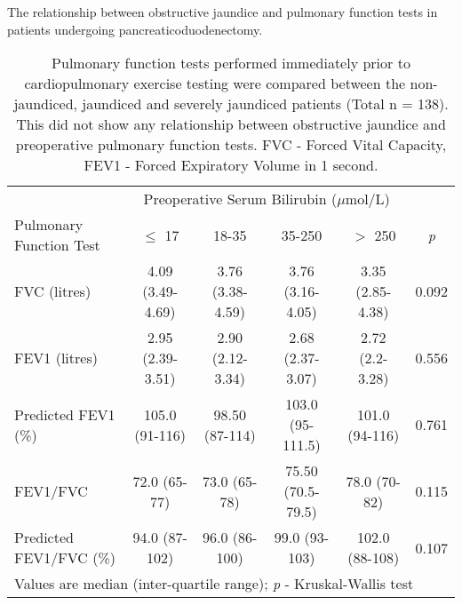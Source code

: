 \begin{sidewaystable}[p]
	\caption{The relationship  between obstructive jaundice and pulmonary function tests in patients undergoing pancreaticoduodenectomy.}
	\label{table:cpet_oj_pft}
	\centering
	\renewcommand{\arraystretch}{1.4} %
	\setlength{\tabcolsep}{9pt} %
	
	\begin{tabular}{|l| c c c c c|}
		\hline
		                        &       \multicolumn{4}{c}{Preoperative Serum Bilirubin ($\mu$mol/L)}        &  \\
		Pulmonary Function Test & $\leq$ 17        & 18-35            & 35-250            & $>$ 250          & \textit{p} \\ \hline
		FVC (litres)            & 4.09 (3.49-4.69) & 3.76 (3.38-4.59) & 3.76 (3.16-4.05)  & 3.35 (2.85-4.38) & 0.092      \\
		FEV1 (litres)           & 2.95 (2.39-3.51) & 2.90 (2.12-3.34) & 2.68 (2.37-3.07)  & 2.72 (2.2-3.28)  & 0.556      \\
		Predicted FEV1 (\%)     & 105.0 (91-116)   & 98.50 (87-114)   & 103.0 (95-111.5)  & 101.0 (94-116)   & 0.761      \\
		FEV1/FVC                & 72.0 (65-77)     & 73.0 (65-78)     & 75.50 (70.5-79.5) & 78.0 (70-82)     & 0.115      \\
		Predicted FEV1/FVC (\%) & 94.0 (87-102)    & 96.0 (86-100)    & 99.0 (93-103)     & 102.0 (88-108)   & 0.107      \\ \hline
		\multicolumn{6}{l}{Values are median (inter-quartile range); \textit{p} - Kruskal-Wallis test}
	\end{tabular}
	\medskip
	\caption*{Pulmonary function tests performed immediately prior to cardiopulmonary exercise testing were compared between the non-jaundiced, jaundiced and severely jaundiced patients (Total n = 138). This did not show any relationship between obstructive jaundice and preoperative pulmonary function tests. FVC - Forced Vital Capacity, FEV1 - Forced Expiratory Volume in 1 second.}
\end{sidewaystable}




